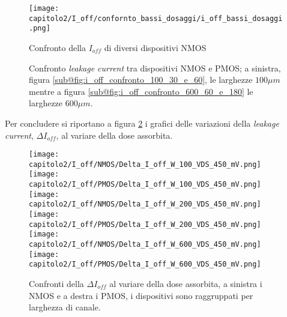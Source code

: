 \begin{figure}[h]

    \centering
    
    \texttt{[image: capitolo2/I\_off/confornto\_bassi\_dosaggi/i\_off\_bassi\_dosaggi.png]}
    \caption[Confronto della $I_{off}$ di diversi dispositivi NMOS]{Confronto della $I_{off}$ di diversi dispositivi NMOS}
    \label{fig:i_off_confronto_bassi_dosaggi}
    
    \vspace{1cm}
    
    \centering

    \caption[Confronto \textit{leakage current} tra dispositivi NMOS e PMOS]{Confronto \textit{leakage current} tra dispositivi NMOS e PMOS; a sinistra, figura \ref{sub@fig:i_off_confronto_100_30_e_60}, le larghezze $100\mu m$ mentre a figura \ref{sub@fig:i_off_confronto_600_60_e_180} le larghezze $600\mu m$.}
    \label{fig:i_off_confronto}
    

\end{figure}


Per concludere si riportano a figura \ref{fig:delta_i_off} i grafici delle variazioni della \textit{leakage current}, $\Delta I_{off}$, al variare della dose assorbita.

\begin{figure}[ht]
    
    \texttt{[image: capitolo2/I\_off/NMOS/Delta\_I\_off\_W\_100\_VDS\_450\_mV.png]}
    \texttt{[image: capitolo2/I\_off/PMOS/Delta\_I\_off\_W\_100\_VDS\_450\_mV.png]}\\
    \vspace{0.2cm}
    \texttt{[image: capitolo2/I\_off/NMOS/Delta\_I\_off\_W\_200\_VDS\_450\_mV.png]}
    \texttt{[image: capitolo2/I\_off/PMOS/Delta\_I\_off\_W\_200\_VDS\_450\_mV.png]}\\
    \vspace{0.2cm}
    \texttt{[image: capitolo2/I\_off/NMOS/Delta\_I\_off\_W\_600\_VDS\_450\_mV.png]}
    \texttt{[image: capitolo2/I\_off/PMOS/Delta\_I\_off\_W\_600\_VDS\_450\_mV.png]}
    
    \caption[$\Delta I_{off}$ al variare della dose assorbita, NMOS e PMOS]{Confronti della $\Delta I_{off}$ al variare della dose assorbita, a sinistra i NMOS e a destra i PMOS, i dispositivi sono raggruppati per larghezza di canale.}
    \label{fig:delta_i_off}
\end{figure}